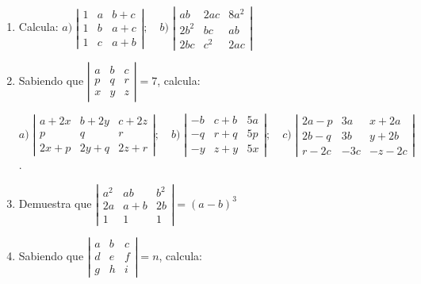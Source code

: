 \begin{enumerate}
\rightline{\textcolor{gris}{Solución: $-abc$.}}

\item Calcula: $a)\; \left| \begin{matrix}1&a&b+c\\1&b&a+c\\1&c&a+b  \end{matrix} \right|; \quad b) \; \left| \begin{matrix} ab&2ac&8a^2\\2b^2&bc&ab\\2bc&c^2&2ac \end{matrix} \right|$

\rightline{\textcolor{gris}{Solución:$a)\; 0;\quad b)\; -3aâb^2c^2$ .}}

\item Sabiendo que $\left| \begin{matrix} a&b&c\\p&q&r\\x&y&z \end{matrix} \right|=7$, calcula:

\footnotesize{$a)\; \left| \begin{matrix} a+2x&b+2y&c+2z\\p&q&r\\2x+p&2y+q&2z+r \end{matrix} \right|; \quad
b)\; \left| \begin{matrix} -b&c+b&5a\\-q&r+q&5p\\-y&z+y&5x \end{matrix} \right|; \quad
c)\; \left| \begin{matrix} 2a-p&3a&x+2a\\2b-q&3b&y+2b\\r-2c&-3c&-z-2c \end{matrix} \right|$}\normalsize{.}

\rightline{\textcolor{gris}{Solución:$a)\; 14;\quad b)\; -35; \quad c)\; 189$ .}}

\item Demuestra que $\left| \begin{matrix} a^2&ab&b^2\\2a&a+b&2b\\1&1&1 \end{matrix} \right|=(a-b)^3$

\rightline{\textcolor{gris}{Solución: Cierto.}}

\item Sabiendo que $\left| \begin{matrix} a&b&c\\d&e&f\\g&h&i \end{matrix} \right|=n$, calcula:


\end{enumerate}
